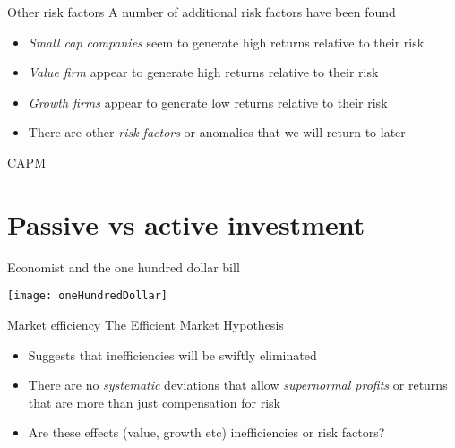 \documentclass[14pt,xcolor=pdftex,dvipsnames,table]{beamer}\usepackage[]{graphicx}\usepackage[]{color}
\begin{document}
\begin{frame}{Other risk factors}
A number of additional risk factors have been found
\begin{itemize}[<+-| alert@+>]
\pause
\item \emph{Small cap companies} seem to generate high returns relative to their risk
\item \emph{Value firm} appear to generate high returns relative to their risk
\item \emph{Growth firms} appear to generate low returns relative to their risk
\item There are other \emph{risk factors} or anomalies that we will return to later
\end{itemize}
\end{frame}

\begin{frame}{CAPM}
\end{frame}

\section{Passive vs active investment}
\begin{frame}{Economist and the one hundred dollar bill}
\begin{center}
\texttt{[image: oneHundredDollar]}
\end{center}
\end{frame}

\begin{frame}{Market efficiency}
The Efficient Market Hypothesis 
\begin{itemize}[<+-| alert@+>]
\pause
\item Suggests that inefficiencies will be swiftly eliminated
\item There are no \emph{systematic} deviations that allow \emph{supernormal profits} or returns that are more than just compensation for risk
\item Are these effects (value, growth etc) inefficiencies or risk factors? 
\end{itemize}
\end{frame}
\end{document}
